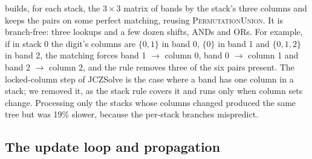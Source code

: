\documentclass[11pt]{article}
\theoremstyle{definition}
\theoremstyle{plain}
\let\origtextsc\textsc
\renewcommand{\textsc}[1]{\textup{\origtextsc{#1}}}
\begin{document}
 builds, for each stack, the $3\times 3$ matrix of bands by the stack's three columns and keeps the
pairs on some perfect matching, reusing \textsc{PermutationUnion}. It is branch-free: three lookups and a few dozen shifts,
ANDs and ORs. For example, if in stack 0 the digit's columns are $\{0,1\}$ in band 0, $\{0\}$ in band 1 and
$\{0,1,2\}$ in band 2, the matching forces band 1 $\to$ column 0, band 0 $\to$ column 1 and band 2 $\to$ column 2, and
the rule removes three of the six pairs present. The locked-column step of JCZSolve is the case where a band has one column
in a stack; we removed it, as the stack rule covers it and runs only when column sets change. Processing only the
stacks whose columns changed produced the same tree but was 19\% slower, because the per-stack branches mispredict.

\subsection{The update loop and propagation}
\end{document}
